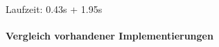 Laufzeit: 0.43s + 1.95s





\paragraph{Vergleich \bzgl{} vorhandener Implementierungen}
\label{vergleich_laufzeit}


